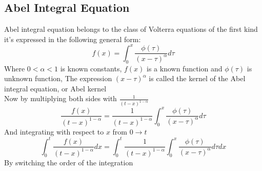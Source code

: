 \newpage
\subsection{Abel Integral Equation}
Abel integral equation belongs to the class of Volterra equations of the first kind
it's expressed in the following general form:
\[
f(x) = \int_{0}^{x} \frac{\phi(\tau)}{{(x-\tau )}^\alpha} d\tau
\]
Where $0<\alpha<1$ is known constants, $f(x)$ is a known function and $\phi(\tau)$ is unknown function,
The expression ${(x-\tau )}^\alpha$  is called the kernel of the Abel integral equation, or Abel kernel
\\
Now by multiplying both sides with $\displaystyle \frac{1}{{(t-x)}^{1-\alpha}}$
\[
\frac{f(x)}{{(t-x)}^{1-\alpha}} = \frac{1}{{(t-x)}^{1-\alpha}} \int_{0}^{x} \frac{\phi(\tau)}{{(x-\tau)}^\alpha} d\tau
\]
And integrating with respect to $x$ from $0 \to t$
\[
\int_{0}^{t} \frac{f(x)}{{(t-x)}^{1-\alpha}} dx=  \int_{0}^{t} \frac{1}{{(t-x)}^{1-\alpha}} \int_{0}^{x} \frac{\phi(\tau)}{{(x-\tau)}^\alpha} d\tau dx
\]
By switching the order of the integration 

